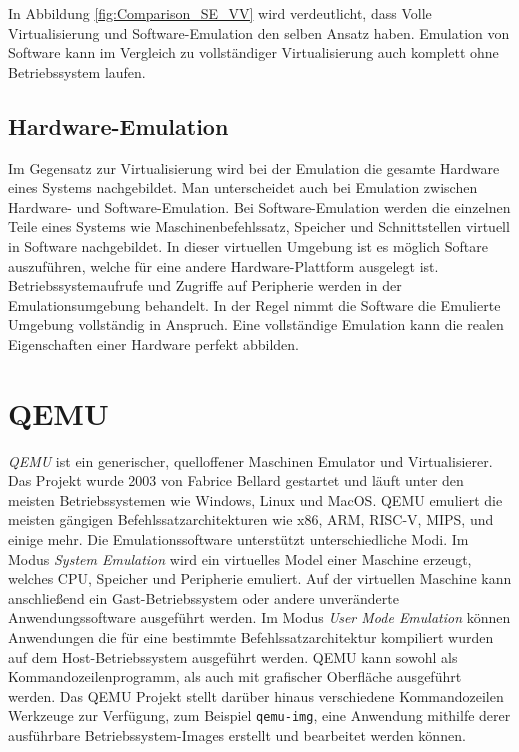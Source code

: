 In Abbildung \ref{fig:Comparison_SE_VV} wird verdeutlicht, dass Volle
Virtualisierung und Software-Emulation den selben Ansatz haben.
Emulation von Software kann im Vergleich zu vollständiger Virtualisierung auch
komplett ohne Betriebssystem laufen.

\subsection{Hardware-Emulation}

Im Gegensatz zur Virtualisierung wird bei der Emulation die gesamte Hardware
eines Systems nachgebildet.
Man unterscheidet auch bei Emulation zwischen Hardware- und Software-Emulation.
Bei Software-Emulation werden die einzelnen Teile eines Systems wie
Maschinenbefehlssatz, Speicher und Schnittstellen virtuell in Software
nachgebildet\cite{BSKompakt_Virt}.
In dieser virtuellen Umgebung ist es möglich Softare auszuführen, welche
für eine andere Hardware-Plattform ausgelegt ist\cite{BSKompakt_Virt}.
Betriebssystemaufrufe und Zugriffe auf Peripherie werden in der
Emulationsumgebung behandelt.
In der Regel nimmt die Software die Emulierte Umgebung vollständig in Anspruch.
Eine vollständige Emulation kann die realen Eigenschaften einer Hardware
perfekt abbilden.


\section{QEMU}

\textit{QEMU} ist ein generischer, quelloffener Maschinen Emulator und
Virtualisierer\cite{QemuAbout}.
Das Projekt wurde 2003 von Fabrice Bellard gestartet und läuft unter den
meisten Betriebssystemen wie Windows, Linux und MacOS.
QEMU emuliert die meisten gängigen Befehlssatzarchitekturen wie x86, ARM,
RISC-V, MIPS, und einige mehr\cite{WikiQemu}.
Die Emulationssoftware unterstützt unterschiedliche Modi.
Im Modus \textit{System Emulation} wird ein virtuelles Model einer Maschine
erzeugt, welches CPU, Speicher und Peripherie emuliert.
Auf der virtuellen Maschine kann anschließend ein Gast-Betriebssystem oder
andere unveränderte Anwendungssoftware ausgeführt werden.
\newline
Im Modus \textit{User Mode Emulation} können Anwendungen die für eine bestimmte
Befehlssatzarchitektur kompiliert wurden auf dem Host-Betriebssystem ausgeführt
werden.
\newline
QEMU kann sowohl als Kommandozeilenprogramm, als auch mit grafischer Oberfläche
ausgeführt werden.
Das QEMU Projekt stellt darüber hinaus verschiedene Kommandozeilen Werkzeuge
zur Verfügung, zum Beispiel \texttt{qemu-img}, eine Anwendung mithilfe derer
ausführbare Betriebssystem-Images erstellt und bearbeitet werden können.

